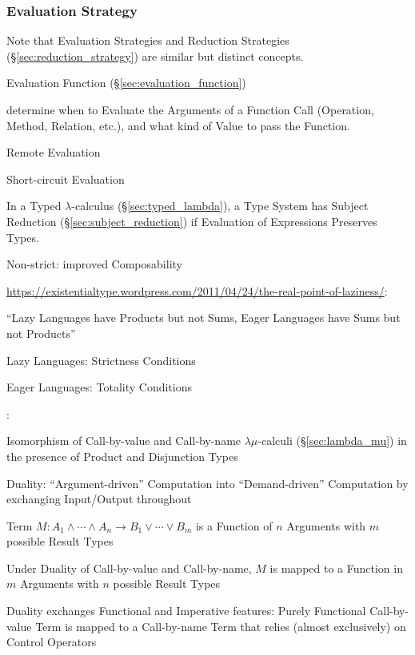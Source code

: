 \subsubsection{Evaluation Strategy}\label{sec:evaluation_strategy}

\fist Note that Evaluation Strategies and Reduction Strategies
(\S\ref{sec:reduction_strategy}) are similar but distinct concepts.

Evaluation Function (\S\ref{sec:evaluation_function})

determine when to Evaluate the Arguments of a Function Call
(Operation, Method, Relation, etc.), and what kind of Value to pass
the Function.

Remote Evaluation

Short-circuit Evaluation

In a Typed $\lambda$-calculus (\S\ref{sec:typed_lambda}), a Type
System has Subject Reduction (\S\ref{sec:subject_reduction}) if
Evaluation of Expressions Preserves Types.

Non-strict: improved Composability %

\url{https://existentialtype.wordpress.com/2011/04/24/the-real-point-of-laziness/}:

``Lazy Languages have Products but not Sums, Eager Languages have Sums
but not Products''

Lazy Languages: Strictness Conditions %

Eager Languages: Totality Conditions %


\asterism


\cite{selinger01}:

Isomorphism of Call-by-value and Call-by-name $\lambda\mu$-calculi
(\S\ref{sec:lambda_mu}) in the presence of Product and Disjunction
Types

Duality: ``Argument-driven'' Computation into ``Demand-driven''
Computation by exchanging Input/Output throughout

Term $M : A_1 \wedge \cdots \wedge A_n \rightarrow B_1 \vee \cdots
\vee B_m$ is a Function of $n$ Arguments with $m$ possible Result
Types

Under Duality of Call-by-value and Call-by-name, $M$ is mapped to a
Function in $m$ Arguments with $n$ possible Result Types

Duality exchanges Functional and Imperative features: Purely
Functional Call-by-value Term is mapped to a Call-by-name Term that
relies (almost exclusively) on Control Operators %



